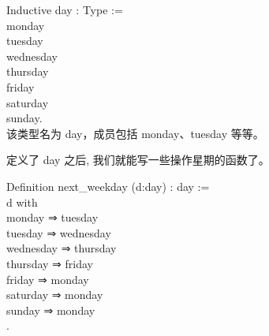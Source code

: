 \documentclass[utf8]{ctexart}
\begin{document}
{Inductive} {day} : {Type} :=\\
\hspace*{0.333em}\hspace*{0.333em}\textbar{} {monday}\\
\hspace*{0.333em}\hspace*{0.333em}\textbar{} {tuesday}\\
\hspace*{0.333em}\hspace*{0.333em}\textbar{} {wednesday}\\
\hspace*{0.333em}\hspace*{0.333em}\textbar{} {thursday}\\
\hspace*{0.333em}\hspace*{0.333em}\textbar{} {friday}\\
\hspace*{0.333em}\hspace*{0.333em}\textbar{} {saturday}\\
\hspace*{0.333em}\hspace*{0.333em}\textbar{} {sunday}.\\

该类型名为 {{day}}，成员包括 {{monday}}、{{tuesday}} 等等。

定义了 {{day}} 之后, 我们就能写一些操作星期的函数了。

{Definition} {next\_weekday} ({d}:{day}) : {day} :=\\
\hspace*{0.333em}\hspace*{0.333em}{match} {d} {with}\\
\hspace*{0.333em}\hspace*{0.333em}\textbar{} {monday} ⇒ {tuesday}\\
\hspace*{0.333em}\hspace*{0.333em}\textbar{} {tuesday} ⇒ {wednesday}\\
\hspace*{0.333em}\hspace*{0.333em}\textbar{} {wednesday} ⇒ {thursday}\\
\hspace*{0.333em}\hspace*{0.333em}\textbar{} {thursday} ⇒ {friday}\\
\hspace*{0.333em}\hspace*{0.333em}\textbar{} {friday} ⇒ {monday}\\
\hspace*{0.333em}\hspace*{0.333em}\textbar{} {saturday} ⇒ {monday}\\
\hspace*{0.333em}\hspace*{0.333em}\textbar{} {sunday} ⇒ {monday}\\
\hspace*{0.333em}\hspace*{0.333em}{end}.\\
\end{document}
